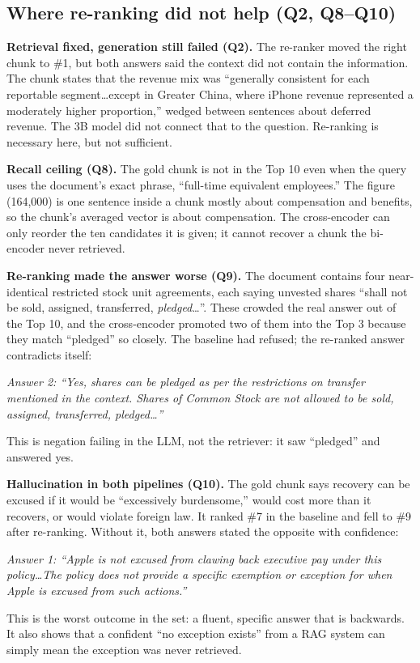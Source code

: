 \documentclass[10pt,a4paper]{article}
\newcommand{\ans}[1]{\par\smallskip\noindent\hspace*{1.2em}\begin{minipage}{0.94\linewidth}\small\itshape #1\end{minipage}\par\smallskip}
\begin{document}
\subsection*{Where re-ranking did not help (Q2, Q8--Q10)}

\textbf{Retrieval fixed, generation still failed (Q2).} The re-ranker moved the right chunk
to \#1, but both answers said the context did not contain the information. The chunk states
that the revenue mix was ``generally consistent for each reportable segment\ldots except in
Greater China, where iPhone revenue represented a moderately higher proportion,'' wedged
between sentences about deferred revenue. The 3B model did not connect that to the question.
Re-ranking is necessary here, but not sufficient.

\textbf{Recall ceiling (Q8).} The gold chunk is not in the Top 10 even when the query uses
the document's exact phrase, ``full-time equivalent employees.'' The figure (164,000) is one
sentence inside a chunk mostly about compensation and benefits, so the chunk's averaged
vector is about compensation. The cross-encoder can only reorder the ten candidates it is
given; it cannot recover a chunk the bi-encoder never retrieved.

\textbf{Re-ranking made the answer worse (Q9).} The document contains four near-identical
restricted stock unit agreements, each saying unvested shares ``shall not be sold, assigned,
transferred, \emph{pledged}\ldots''. These crowded the real answer out of the Top 10, and the
cross-encoder promoted two of them into the Top 3 because they match ``pledged'' so closely.
The baseline had refused; the re-ranked answer contradicts itself:
\ans{Answer 2: ``Yes, shares can be pledged as per the restrictions on transfer mentioned in
the context. Shares of Common Stock are not allowed to be sold, assigned, transferred,
pledged\ldots''}
This is negation failing in the LLM, not the retriever: it saw ``pledged'' and answered yes.

\textbf{Hallucination in both pipelines (Q10).} The gold chunk says recovery can be excused
if it would be ``excessively burdensome,'' would cost more than it recovers, or would violate
foreign law. It ranked \#7 in the baseline and fell to \#9 after re-ranking. Without it, both
answers stated the opposite with confidence:
\ans{Answer 1: ``Apple is not excused from clawing back executive pay under this
policy\ldots The policy does not provide a specific exemption or exception for when Apple is
excused from such actions.''}
This is the worst outcome in the set: a fluent, specific answer that is backwards. It also
shows that a confident ``no exception exists'' from a RAG system can simply mean the
exception was never retrieved.
\end{document}
